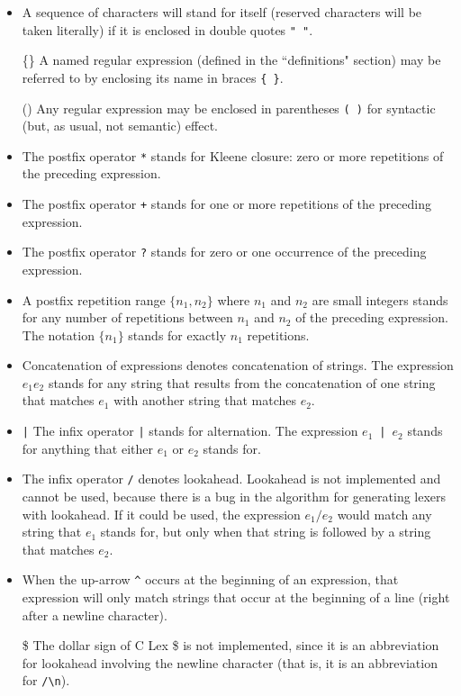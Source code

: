 \begin{itemize}
\item[\verb|"|] A sequence of characters will stand for itself (reserved
        characters will be taken literally) if it is enclosed in
        double quotes \verb|" "|.

\item[\{\}]     A named regular expression (defined in the ``definitions"
        section) may be referred to by enclosing its name in
        braces \verb|{ }|.

\item[()] Any regular expression may be enclosed in parentheses \verb|( )|
        for syntactic (but, as usual, not semantic) effect.

\item[\verb|*|] The postfix operator \verb|*| stands for Kleene closure:
        zero or more repetitions of the preceding expression.

\item[\verb|+|] The postfix operator \verb|+| stands for one or more repetitions
        of the preceding expression.

\item[\verb|?|] The postfix operator \verb|?| stands for zero or one occurrence of
        the preceding expression.

\item   A postfix repetition range $\{n_1,n_2\}$ where $n_1$ and $n_2$ are small
        integers stands for any number of repetitions between $n_1$ and $n_2$
        of the preceding expression.  The notation $\{n_1\}$ stands for
        exactly $n_1$ repetitions.

\item   Concatenation of expressions denotes concatenation of strings.
        The expression $e_1 e_2$ stands for any string that results from
        the concatenation of one string that matches $e_1$ with another
        string that matches $e_2$.

\item\verb-|-   The infix operator \verb-|- stands for alternation.  The expression
        $e_1$~\verb"|"~$e_2$  stands for anything that either $e_1$ or $e_2$ stands for.
    
\item[\verb|/|] The infix operator \verb|/| denotes lookahead.  Lookahead is not
        implemented and cannot be used, because there is a bug
        in the algorithm for generating lexers with lookahead.  If
        it could be used, the expression $e_1 / e_2$ would match any string
        that $e_1$ stands for, but only when that string is followed by a
        string that matches $e_2$.

\item   When the up-arrow \verb|^| occurs at the beginning of an expression,
        that expression will only match strings that occur at the
        beginning of a line (right after a newline character).

\item[\$]   The dollar sign of C Lex \$ is not implemented, since it is an abbreviation
        for lookahead involving the newline character (that is, it
        is an abbreviation for \verb|/\n|).
\end{itemize}
        
